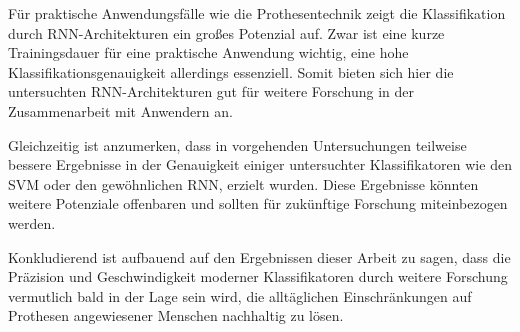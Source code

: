 Für praktische Anwendungsfälle wie die Prothesentechnik zeigt die Klassifikation durch RNN-Architekturen ein großes Potenzial auf. Zwar ist eine kurze Trainingsdauer für eine praktische Anwendung wichtig, eine hohe Klassifikationsgenauigkeit allerdings essenziell. Somit bieten sich hier die untersuchten RNN-Architekturen gut für weitere Forschung in der Zusammenarbeit mit Anwendern an.

Gleichzeitig ist anzumerken, dass in vorgehenden Untersuchungen teilweise bessere Ergebnisse in der Genauigkeit einiger untersuchter Klassifikatoren wie den SVM oder den gewöhnlichen RNN, erzielt wurden. Diese Ergebnisse könnten weitere Potenziale offenbaren und sollten für zukünftige Forschung miteinbezogen werden.

Konkludierend ist aufbauend auf den Ergebnissen dieser Arbeit zu sagen, dass die Präzision und Geschwindigkeit moderner Klassifikatoren durch weitere Forschung vermutlich bald in der Lage sein wird, die alltäglichen Einschränkungen auf Prothesen angewiesener Menschen nachhaltig zu lösen. 
